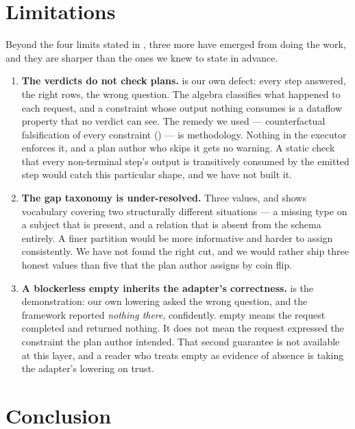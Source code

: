 \documentclass[11pt,a4paper]{article}
\theoremstyle{plain}
\theoremstyle{definition}
\theoremstyle{remark}
\newcommand{\vans}{\textsf{answered}}
\newcommand{\vempty}{\textsf{empty}}
\begin{document}
\section{Limitations}
\label{sec:limits}

Beyond the four limits stated in , three more have
emerged from doing the work, and they are sharper than the ones we knew
to state in advance.

\begin{enumerate}[label=(\roman*),leftmargin=2.2em]
\item \textbf{The verdicts do not check plans.}  is our own
  defect: every step \vans, the right rows, the wrong question. The
  algebra classifies what happened to each request, and a constraint
  whose output nothing consumes is a dataflow property that no verdict
  can see. The remedy we used --- counterfactual falsification of every
  constraint () --- is methodology. Nothing in
  the executor enforces it, and a plan author who skips it gets no
  warning. A static check that every non-terminal step's output is
  transitively consumed by the emitted step would catch this particular
  shape, and we have not built it.
\item \textbf{The gap taxonomy is under-resolved.} Three values, and
   shows \textsf{vocabulary} covering two structurally
  different situations --- a missing type on a subject that is present,
  and a relation that is absent from the schema entirely. A finer
  partition would be more informative and harder to assign consistently.
  We have not found the right cut, and we would rather ship three
  honest values than five that the plan author assigns by coin flip.
\item \textbf{A blockerless \vempty{} inherits the adapter's
  correctness.}  is the demonstration: our own
  lowering asked the wrong question, and the framework reported
  \emph{nothing there}, confidently. \vempty{} means the request
  completed and returned nothing. It does not mean the request expressed
  the constraint the plan author intended. That second guarantee is not
  available at this layer, and a reader who treats \vempty{} as evidence
  of absence is taking the adapter's lowering on trust.
\end{enumerate}

\section{Conclusion}
\label{sec:conclusion}
\end{document}

